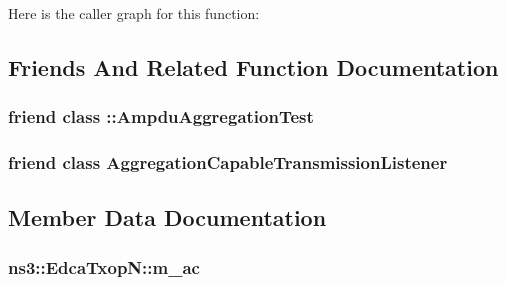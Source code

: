Here is the caller graph for this function\+:




\subsection{Friends And Related Function Documentation}
\subsubsection[{\texorpdfstring{\+::\+Ampdu\+Aggregation\+Test}{::AmpduAggregationTest}}]{\setlength{\rightskip}{0pt plus 5cm}friend class \+::{\bf Ampdu\+Aggregation\+Test}\hspace{0.3cm}{\ttfamily [friend]}}\hypertarget{classns3_1_1EdcaTxopN_ac40416d983d6f5074b1f4d2d84900b75}{}\label{classns3_1_1EdcaTxopN_ac40416d983d6f5074b1f4d2d84900b75}
\subsubsection[{\texorpdfstring{Aggregation\+Capable\+Transmission\+Listener}{AggregationCapableTransmissionListener}}]{\setlength{\rightskip}{0pt plus 5cm}friend class Aggregation\+Capable\+Transmission\+Listener\hspace{0.3cm}{\ttfamily [friend]}}\hypertarget{classns3_1_1EdcaTxopN_a8cc48b082c4f0c3cb2a41f8dfd138405}{}\label{classns3_1_1EdcaTxopN_a8cc48b082c4f0c3cb2a41f8dfd138405}


\subsection{Member Data Documentation}
\subsubsection[{\texorpdfstring{m\+\_\+ac}{m_ac}}]{ ns3\+::\+Edca\+Txop\+N\+::m\+\_\+ac\hspace{0.3cm}{\ttfamily [private]}}\hypertarget{classns3_1_1EdcaTxopN_ae385fb8b4514a4fb866739c9a0d2a772}{}\label{classns3_1_1EdcaTxopN_ae385fb8b4514a4fb866739c9a0d2a772}


